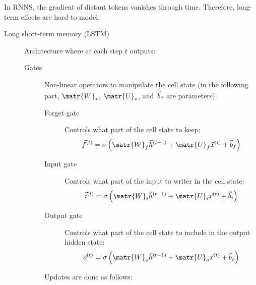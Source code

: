 \begin{remark}
    In RNNS, the gradient of distant tokens vanishes through time. Therefore, long-term effects are hard to model.
\end{remark}

\begin{description}
    \item[Long short-term memory (LSTM)] 
        Architecture where at each step $t$ outputs:

        \begin{description}
            \item[Gates]
                Non-linear operators to manipulate the cell state (in the following part, $\matr{W}_*$, $\matr{U}_*$, and $\vec{b}_*$ are parameters).

                \begin{description}
                    \item[Forget gate] 
                        Controls what part of the cell state to keep:
                        \[ \vec{f}^{(t)} = \sigma\left( \matr{W}_f \vec{h}^{(t-1)} + \matr{U}_f \vec{x}^{(t)} + \vec{b}_f \right) \]

                    \item[Input gate] 
                        Controls what part of the input to writer in the cell state:
                        \[ \vec{i}^{(t)} = \sigma\left( \matr{W}_i \vec{h}^{(t-1)} + \matr{U}_i \vec{x}^{(t)} + \vec{b}_i \right) \]

                    \item[Output gate] 
                        Controls what part of the cell state to include in the output hidden state:
                        \[ \vec{o}^{(t)} = \sigma\left( \matr{W}_o \vec{h}^{(t-1)} + \matr{U}_o \vec{x}^{(t)} + \vec{b}_o \right) \]
                    \end{description}

                Updates are done as follows:
        \end{description}


\end{description}
